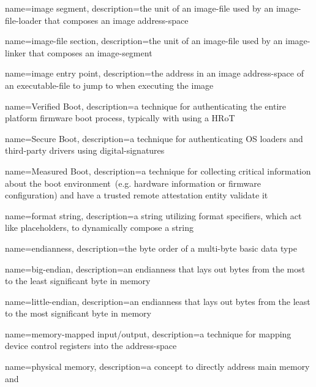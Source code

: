 {
  name={\gls{image} segment},
  description={the unit of an \gls{image-file} used by an \gls{image-file-loader} that composes an \gls{image} \gls{address-space}}
}

{
  name={\gls{image-file} section},
  description={the unit of an \gls{image-file} used by an \gls{image-linker} that composes an \gls{image-segment}}
}

{
  name={\gls{image} entry point},
  description={the address in an \gls{image} \gls{address-space} of an \gls{executable-file} to jump to when executing the \gls{image}}
}

{
  name={Verified Boot},
  description={a technique for authenticating the entire platform \gls{firmware} boot process, typically with using a \gls{HRoT}}
}

{
  name={Secure Boot},
  description={a technique for authenticating  \gls{OS} loaders and third-party drivers using \glspl{digital-signature}}
}

{
  name={Measured Boot},
  description={a technique for collecting critical information about the boot environment~(e.g. hardware information or \gls{firmware} configuration) and have a trusted remote attestation entity validate it}
}

{
  name={format string},
  description={a string utilizing format specifiers, which act like placeholders, to dynamically compose a string}
}

{
  name={endianness},
  description={the \gls{byte} order of a multi-\gls{byte} basic data type}
}

{
  name={big-endian},
  description={an \gls{endianness} that lays out \glspl{byte} from the most to the least significant \gls{byte} in memory}
}

{
  name={little-endian},
  description={an \gls{endianness} that lays out \glspl{byte} from the least to the most significant \gls{byte} in memory}
}

{
  name={memory-mapped input/output},
  description={a technique for mapping device control registers into the  \gls{address-space}}
}

{
  name={physical memory},
  description={a concept to directly address main memory and }
}


